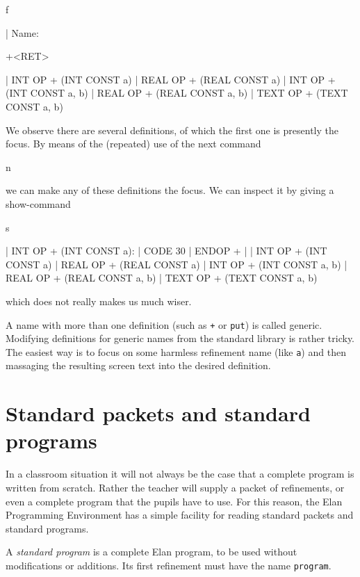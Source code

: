 \begin{elan}
        f

|       Name:\cursor

        +<RET>

|       INT OP + (INT CONST a)\cursor
|       REAL OP + (REAL CONST a)
|       INT OP + (INT CONST a, b)
|       REAL OP + (REAL CONST a, b)
|       TEXT OP + (TEXT CONST a, b)
\end{elan}

We observe there are several definitions, of which the first one is
presently the focus. By means of the (repeated) use of the next command

\begin{elan}
        n
\end{elan}

\noindent
we can make any  of these definitions the focus.
We can inspect it by giving a show-command

\begin{elan}
        s

|       INT OP + (INT CONST a):
|         CODE 30
|       ENDOP +
|
|       INT OP + (INT CONST a)\cursor
|       REAL OP + (REAL CONST a)
|       INT OP + (INT CONST a, b)
|       REAL OP + (REAL CONST a, b)
|       TEXT OP + (TEXT CONST a, b)
\end{elan}

\noindent
which does not really makes us much wiser.

A name with more than one definition (such as {\tt +} or {\tt put})
is called generic.
Modifying definitions for generic names from the standard library
is rather tricky.
The easiest way is to focus on some harmless refinement name
(like {\tt a}) and then massaging the resulting screen text into the
desired definition.

\section{Standard packets and standard programs}

In a classroom situation it will not always be the case that
a complete program is written from scratch. Rather the teacher
will supply a packet of refinements, or even a complete program
that the pupils have to use.
For this reason, the Elan Programming Environment has a simple
facility for reading standard packets and standard programs.

A {\em standard program} is a complete Elan program, to be used
without modifications or additions. Its first refinement must
have the name {\tt program}.

